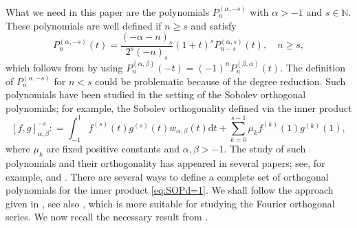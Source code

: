 \documentclass{amsart}
\theoremstyle{remark}
\def\d{\mathrm{d}}
\def\a{{\alpha}}
\def\b{{\beta}}
\def\NN{{\mathbb N}}
\begin{document}
What we need in this paper are the polynomials $P_n^{(\a,-s)}$ with $\a > -1$ and $s \in \NN$. These
polynomials are well defined if $n \ge s$ and satisfy \cite[Section 4.22]{Sz}
\begin{equation}\label{eq:Jacobi_n<0}
    P_n^{(\a,-s)} (t) = \frac{(-\a-n)_s}{2^s (-n)_s} (1+t)^s P_{n-s}^{(\a,s)}(t), \quad n \ge s,
\end{equation}
which follows from \cite[(4.22.2)]{Sz} by using $P_n^{(\a,\b)}(-t) = (-1)^n P_n^{(\b,\a)}(t)$. The definition of
$P_n^{(\a,-s)}$ for $n < s$ could be problematic because of the degree reduction. Such polynomials have
been studied in the setting of the Sobolev orthogonal polynomials; for example, the Sobolev orthogonality
defined via the inner product
\begin{equation} \label{eq:SOPd=1}
   [f,g]_{\a,\b}^{-s} : = \int_{-1}^1 f^{(s)}(t) g^{(s)}(t) w_{\a,\b}(t) \d t + \sum_{k=0}^{s-1} \mu_k f^{(k)}(1)g^{(k)}(1),
\end{equation}
where $\mu_k$ are fixed positive constants and $\a ,\b > -1$. The study of such polynomials and their
orthogonality has appeared in several papers; see, for example, \cite{AAR02, GW, MPP, Sh1, Sh2, X17, X19}
and \cite{MX}. There are several ways to define a complete set of orthogonal polynomials for the inner
product \eqref{eq:SOPd=1}. We shall follow the approach given in \cite{X19}, see also \cite{Sh1, Sh2}, which
is more suitable for studying the Fourier orthogonal series. We now recall the necessary result from \cite{X19}.
\end{document}
